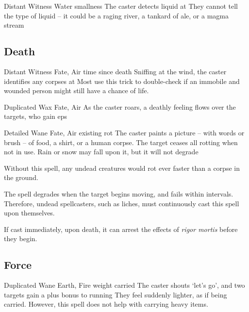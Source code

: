 \begin{multicols}{2}
  {Distant}%
  {Witness}%
  {Water}%
  {smallness}%
  {The caster detects liquid at \spellRange}%
  {They cannot tell the type of liquid -- it could be a raging river, a tankard of ale, or a magma stream}

\subsection{Death}


  {Distant}%
  {Witness}%
  {Fate, Air}%
  {time since death}%
  {Sniffing at the wind, the caster identifies any corpses at \spellRange}%
  {Most use this trick to double-check if an immobile and wounded person might still have a chance of life.}

  {Duplicated}%
  {Wax}%
  {Fate, Air}%
  {}%
  {As the caster roars, a deathly feeling flows over the targets, who gain  \glspl{ep}}%
  {}

  {Detailed}%
  {Wane}%
  {Fate, Air}%
  {existing rot}%
  {The caster paints a picture -- with words or brush -- of food, a shirt, or a human corpse.
  The target ceases all rotting when not in use.
  Rain or snow may fall upon it, but it will not degrade}%
  {
    Without this spell, any undead creatures would rot ever faster than a corpse in the ground.

    The spell degrades when the target begins moving, and fails within  \glspl{interval}.
    Therefore, undead spellcasters, such as liches, must continuously cast this spell upon themselves.

    If cast immediately, upon death, it can arrest the effects of \textit{rigor mortis} before they begin.
  }

\subsection{Force}

  {Duplicated}%
  {Wane}%
  {Earth, Fire}%
  {\gls{weight} carried}%
  {The caster shouts `let's go', and two targets gain a plus  bonus to running}%
  {They feel suddenly lighter, as if being carried.
  However, this spell does not help with carrying heavy items.}


\end{multicols}
